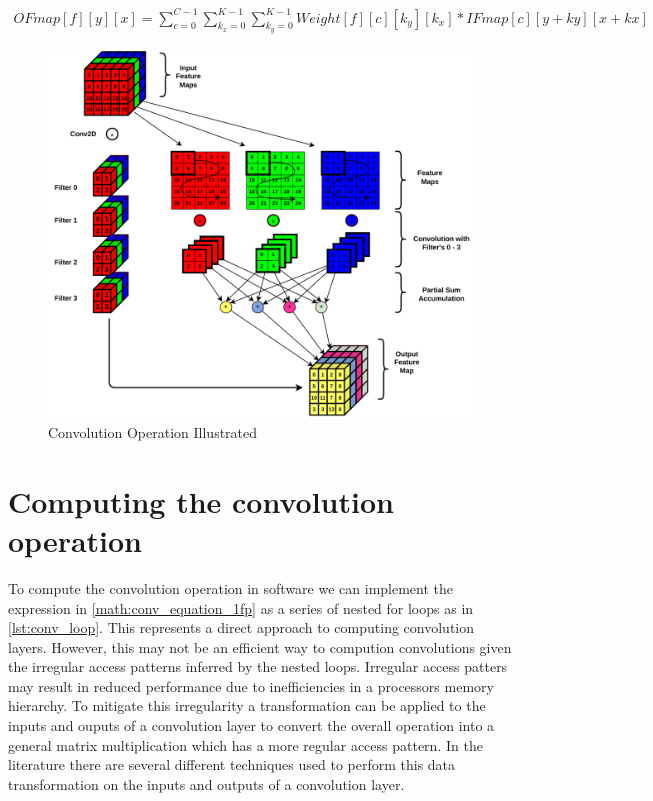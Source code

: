 \begin{align}
    OFmap[f][y][x] = \displaystyle\sum\limits_{c=0}^{C-1}\displaystyle\sum\limits_{k_x=0}^{K-1}\displaystyle\sum\limits_{k_y=0}^{K-1}Weight[f][c][k_y][k_x]*IFmap[c][y+ky][x+kx]
    \label{math:conv_equation_1fp}
\end{align}

\begin{figure}[ht]
    \centering
    \includegraphics[scale=0.6]{fig/ConvExplained.pdf}
    \caption{Convolution Operation Illustrated}
    \label{fig:conv_explained}
\end{figure}

\section{Computing the convolution operation}
\label{chap:background:computing_conv}

To compute the convolution operation in software we can implement the expression
in \autoref{math:conv_equation_1fp} as a series of nested for loops as in
\autoref{lst:conv_loop}. This represents a direct approach to computing
convolution layers. However, this may not be an efficient way to compution
convolutions given the irregular access patterns inferred by the nested loops.
Irregular access patters may result in reduced performance due to inefficiencies
in a processors memory hierarchy. To mitigate this irregularity a transformation
can be applied to the inputs and ouputs of a convolution layer to convert the
overall operation into a general matrix multiplication which has a more regular
access pattern. In the literature
\cite{cafe_con_troll} there
are several different techniques used to perform this data transformation on the
inputs and outputs of a convolution layer.

